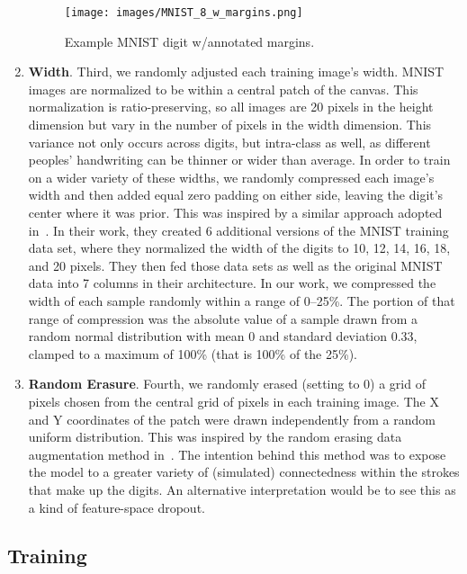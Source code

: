 \documentclass{article}
\newcommand{\rightparenthesis}{)}
\begin{document}
\begin{enumerate}[label=\arabic*\rightparenthesis]
\begin{figure}[ht]
  \centering
  \texttt{[image: images/MNIST\_8\_w\_margins.png]}
  \caption{Example MNIST digit w/annotated margins.}\label{fig:example_mnist_digit}
\end{figure}

\item \textbf{Width}.  Third, we randomly adjusted each training image's width.  MNIST images are normalized to be within a  central patch of the  canvas.  This normalization is ratio-preserving, so all images are 20 pixels in the height dimension but vary in the number of pixels in the width dimension.  This variance not only occurs across digits, but intra-class as well, as different peoples' handwriting can be thinner or wider than average.  In order to train on a wider variety of these widths, we randomly compressed each image's width and then added equal zero padding on either side, leaving the digit's center where it was prior.  This was inspired by a similar approach adopted in~\cite{Ciresan2012}.  In their work, they created 6 additional versions of the MNIST training data set, where they normalized the width of the digits to 10, 12, 14, 16, 18, and 20 pixels.  They then fed those data sets as well as the original MNIST data into 7 columns in their architecture.  In our work, we compressed the width of each sample randomly within a range of 0--25\%.  The portion of that range of compression was the absolute value of a sample drawn from a random normal distribution with mean 0 and standard deviation 0.33, clamped to a maximum of 100\% (that is 100\% of the 25\%).
\item \textbf{Random Erasure}.  Fourth, we randomly erased (setting to 0) a  grid of pixels chosen from the central  grid of pixels in each training image.  The X and Y coordinates of the patch were drawn independently from a random uniform distribution.  This was inspired by the random erasing data augmentation method in~\cite{Zhong2017}.  The intention behind this method was to expose the model to a greater variety of (simulated) connectedness within the strokes that make up the digits.  An alternative interpretation would be to see this as a kind of feature-space dropout.
\end{enumerate}

\subsection{Training}
\end{document}
